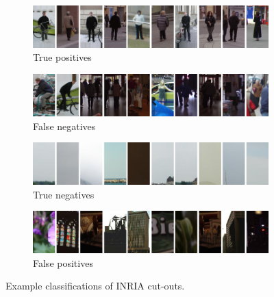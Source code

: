 \documentclass[thesis.tex]{subfiles}
\begin{document}
%
%
\begin{figure}
	\begin{subfigure}[t]{\textwidth}
		\centerline{\includegraphics[width=1.2\textwidth]{img/objectDetectionTP.png}}
		\caption{True positives}
		\label{fig:objectDetectionTP}
		\vspace{2mm}
	\end{subfigure}
	\begin{subfigure}[t]{\textwidth}
		\centerline{\includegraphics[width=1.2\textwidth]{img/objectDetectionFN.png}}
		\caption{False negatives}
		\label{fig:objectDetectionFN}
		\vspace{2mm}
	\end{subfigure}
	\begin{subfigure}[t]{\textwidth}
		\centerline{\includegraphics[width=1.2\textwidth]{img/objectDetectionTN.png}}
		\caption{True negatives}
		\label{fig:objectDetectionTN}
		\vspace{2mm}
	\end{subfigure}
	\begin{subfigure}[t]{\textwidth}
		\centerline{\includegraphics[width=1.2\textwidth]{img/objectDetectionFP.png}}
		\caption{False positives}
		\label{fig:objectDetectionFP}
	\end{subfigure}
	\caption{Example classifications of INRIA cut-outs.}
	\label{fig:ownDescriptorExample}
\end{figure}
\end{document}
